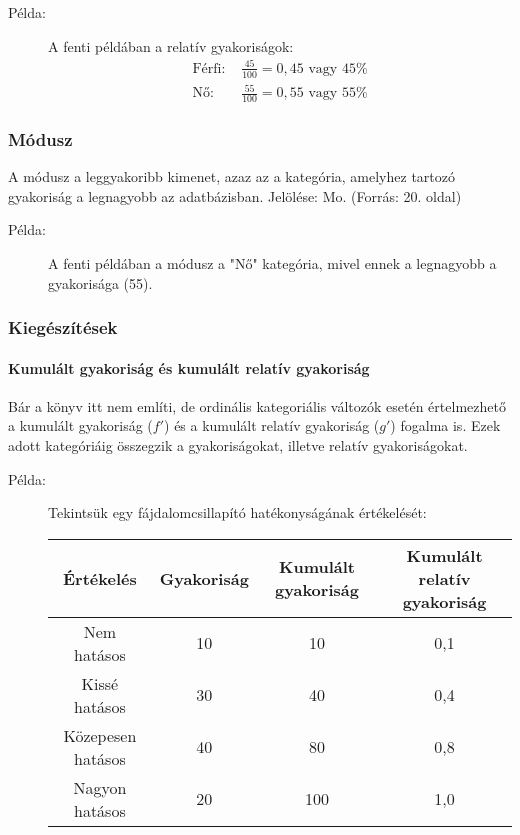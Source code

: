 \documentclass[a4paper,12pt]{article}
\begin{document}
    \begin{description}
        \item[Példa:] A fenti példában a relatív gyakoriságok:
        \begin{align*}
            \text{Férfi: } & \frac{45}{100} = 0,45 \text{ vagy } 45\% \\
            \text{Nő: } & \frac{55}{100} = 0,55 \text{ vagy } 55\%
        \end{align*}
    \end{description}

    \subsubsection{Módusz}
    A módusz a leggyakoribb kimenet, azaz az a kategória, amelyhez tartozó gyakoriság a legnagyobb az adatbázisban. Jelölése: Mo.
    (Forrás: 20. oldal)

    \begin{description}
        \item[Példa:] A fenti példában a módusz a "Nő" kategória, mivel ennek a legnagyobb a gyakorisága (55).
    \end{description}

    \subsubsection{Kiegészítések}

    \paragraph{Kumulált gyakoriság és kumulált relatív gyakoriság}
    Bár a könyv itt nem említi, de ordinális kategoriális változók esetén értelmezhető a kumulált gyakoriság ($f'$) és a kumulált relatív gyakoriság ($g'$) fogalma is. Ezek adott kategóriáig összegzik a gyakoriságokat, illetve relatív gyakoriságokat.

    \begin{description}
        \item[Példa:] Tekintsük egy fájdalomcsillapító hatékonyságának értékelését:
        \begin{center}
            \begin{tabular}{|c|c|c|c|}
                \hline
                Értékelés         & Gyakoriság & Kumulált gyakoriság & Kumulált relatív gyakoriság \\
                \hline
                Nem hatásos       & 10         & 10                  & 0,1                         \\
                Kissé hatásos     & 30         & 40                  & 0,4                         \\
                Közepesen hatásos & 40         & 80                  & 0,8                         \\
                Nagyon hatásos    & 20         & 100                 & 1,0                         \\
                \hline
            \end{tabular}
        \end{center}
    \end{description}
\end{document}
